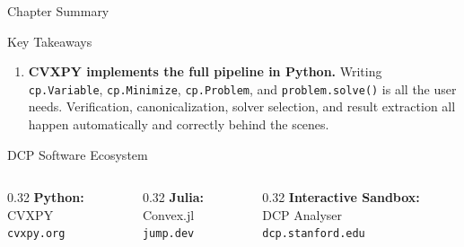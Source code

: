 \documentclass[aspectratio=169,10pt]{beamer}
\begin{document}
\begin{frame}[allowframebreaks]{Chapter Summary}
\begin{block}{Key Takeaways}
\begin{enumerate}
      \item \textbf{CVXPY implements the full pipeline in Python.}
            Writing \texttt{cp.Variable}, \texttt{cp.Minimize},
            \texttt{cp.Problem}, and \texttt{problem.solve()} is all
            the user needs.  Verification, canonicalization, solver
            selection, and result extraction all happen automatically
            and correctly behind the scenes.
    \end{enumerate}
  \end{block}

  \begin{block}{DCP Software Ecosystem}
    \begin{columns}
      \begin{column}{0.32\textwidth}
        \textbf{Python:}\\
        CVXPY\\
        \texttt{cvxpy.org}
      \end{column}
      \begin{column}{0.32\textwidth}
        \textbf{Julia:}\\
        Convex.jl\\
        \texttt{jump.dev}
      \end{column}
      \begin{column}{0.32\textwidth}
        \textbf{Interactive Sandbox:}\\
        DCP Analyser\\
        \texttt{dcp.stanford.edu}
      \end{column}
    \end{columns}
  \end{block}

\end{frame}
\end{document}
